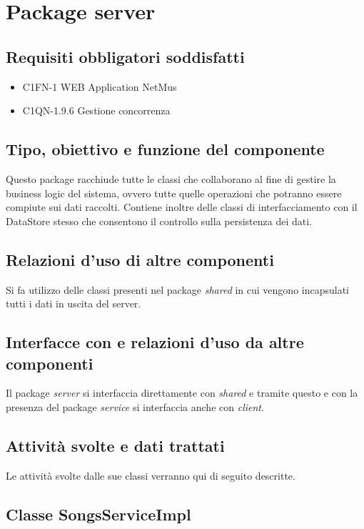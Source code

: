 
\newpage
\section{Package server}
\subsection*{Requisiti obbligatori soddisfatti}
\begin{itemize}
	\item C1FN-1 WEB Application NetMus
	\item C1QN-1.9.6 Gestione concorrenza
\end{itemize}
\subsection*{Tipo, obiettivo e funzione del componente} %
Questo package racchiude tutte le classi che collaborano al fine di gestire la
business logic del sistema, ovvero tutte quelle operazioni che potranno essere
compiute sui dati raccolti. Contiene inoltre delle classi di interfacciamento
con il DataStore stesso che consentono il controllo sulla persistenza dei dati.

\subsection*{Relazioni d'uso di altre componenti}
Si fa utilizzo delle classi presenti nel package \emph{shared} in cui vengono
incapsulati tutti i dati in uscita del server.

\subsection*{Interfacce con e relazioni d'uso da altre componenti}
Il package \emph{server} si interfaccia direttamente con \emph{shared} e tramite
questo e con la presenza del package \emph{service} si interfaccia anche con
\emph{client}.

\subsection*{Attivit\`a svolte e dati trattati}
Le attivit\`a svolte dalle sue classi verranno qui di seguito descritte.

\subsection{Classe SongsServiceImpl}
